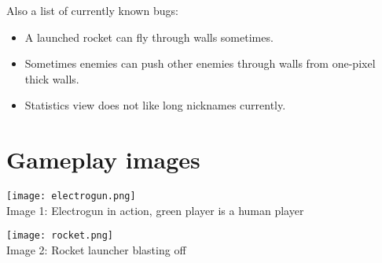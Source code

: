 \documentclass[a4paper,12pt,titlepage]{article}
\begin{document}
Also a list of currently known bugs:
\begin{itemize}
\item A launched rocket can fly through walls sometimes.
\item Sometimes enemies can push other enemies through walls from one-pixel thick
walls.
\item Statistics view does not like long nicknames currently.
\end{itemize}


\appendix
\section{Gameplay images}
\begin{center}
\texttt{[image: electrogun.png]}
\\
Image 1: Electrogun in action, green player is a human player
\end{center}
\begin{center}
\texttt{[image: rocket.png]}
\\
Image 2: Rocket launcher blasting off
\end{center}
\end{document}
